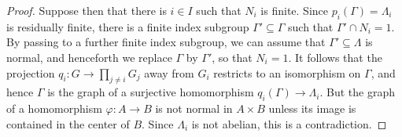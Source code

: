 \documentclass[JEP,XML,SOM,Unicode,published]{cedram}
\theoremstyle{definition}
\begin{document}
\begin{proof}
Suppose then that there is $i\in I$ such that $N_i$ is finite. Since $p_i(\Gamma)=\Lambda_i$ is residually finite, there is a finite index subgroup $\Gamma'\subseteq \Gamma$ such that $\Gamma'\cap N_i=1$. By passing to a further finite index subgroup, we can assume that $\Gamma'\subseteq\Lambda$ is normal, and henceforth we replace $\Gamma$ by $\Gamma'$, so that $N_i=1$. It follows that the projection $q_i:G\to \prod_{j\neq i} G_j$ away from $G_i$ restricts to an isomorphism on $\Gamma$, and hence $\Gamma$ is the graph of a surjective homomorphism $q_i(\Gamma)\to \Lambda_i$. But the graph of a homomorphism $\varphi:A\to B$ is not normal in $A\times B$ unless its image is contained in the center of $B$. Since $\Lambda_i$ is not abelian, this is a contradiction.
\end{proof}

\backmatter


\end{document}
